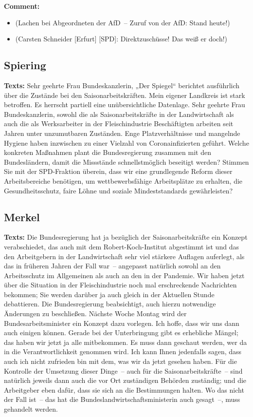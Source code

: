 \documentclass{article}
\begin{document}
\noindent\textbf{Comment:}
\begin{itemize}
    \setlength\itemsep{-3pt}
    \item (Lachen bei Abgeordneten der AfD – Zuruf von der AfD: Stand heute!)
    \setlength\itemsep{-3pt}
    \item (Carsten Schneider [Erfurt] [SPD]: Direktzuschüsse! Das weiß er doch!)
\end{itemize}
\subsection{Spiering}
\noindent\textbf{Texts:} Sehr geehrte Frau Bundeskanzlerin, „Der Spiegel“ berichtet ausführlich über die Zustände bei den Saisonarbeitskräften. Mein eigener Landkreis ist stark betroffen. Es herrscht partiell eine unübersichtliche Datenlage. Sehr geehrte Frau Bundeskanzlerin, sowohl die als Saisonarbeitskräfte in der Landwirtschaft als auch die als Werksarbeiter in der Fleischindustrie Beschäftigten arbeiten seit Jahren unter unzumutbaren Zuständen. Enge Platzverhältnisse und mangelnde Hygiene haben inzwischen zu einer Vielzahl von Coronainfizierten geführt. Welche konkreten Maßnahmen plant die Bundesregierung zusammen mit den Bundesländern, damit die Missstände schnellstmöglich beseitigt werden? Stimmen Sie mit der SPD-Fraktion überein, dass wir eine grundlegende Reform dieser Arbeitsbereiche benötigen, um wettbewerbsfähige Arbeitsplätze zu erhalten, die Gesundheitsschutz, faire Löhne und soziale Mindeststandards gewährleisten?

\subsection{Merkel}
\noindent\textbf{Texts:} Die Bundesregierung hat ja bezüglich der Saisonarbeitskräfte ein Konzept verabschiedet, das auch mit dem Robert-Koch-Institut abgestimmt ist und das den Arbeitgebern in der Landwirtschaft sehr viel stärkere Auflagen auferlegt, als das in früheren Jahren der Fall war – angepasst natürlich sowohl an den Arbeitsschutz im Allgemeinen als auch an den in der Pandemie. Wir haben jetzt über die Situation in der Fleischindustrie noch mal erschreckende Nachrichten bekommen; Sie werden darüber ja auch gleich in der Aktuellen Stunde debattieren. Die Bundesregierung beabsichtigt, auch hierzu notwendige Änderungen zu beschließen. Nächste Woche Montag wird der Bundesarbeitsminister ein Konzept dazu vorlegen. Ich hoffe, dass wir uns dann auch einigen können. Gerade bei der Unterbringung gibt es erhebliche Mängel; das haben wir jetzt ja alle mitbekommen. Es muss dann geschaut werden, wer da in die Verantwortlichkeit genommen wird. Ich kann Ihnen jedenfalls sagen, dass auch ich nicht zufrieden bin mit dem, was wir da jetzt gesehen haben. Für die Kontrolle der Umsetzung dieser Dinge – auch für die Saisonarbeitskräfte – sind natürlich jeweils dann auch die vor Ort zuständigen Behörden zuständig; und die Arbeitgeber eben dafür, dass sie sich an die Bestimmungen halten. Wo das nicht der Fall ist – das hat die Bundeslandwirtschaftsministerin auch gesagt –, muss gehandelt werden.
\end{document}

